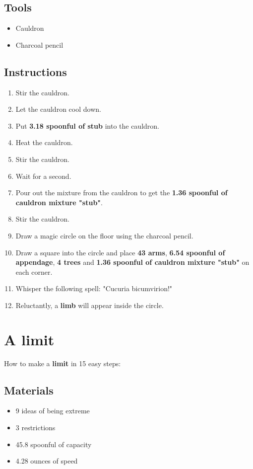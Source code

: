 \documentclass{article}
\begin{document}
\subsection{Tools}\begin{itemize}
\item 
Cauldron
\item 
Charcoal pencil
\end{itemize}
\subsection{Instructions}\begin{enumerate}
\item 
Stir the cauldron.
\item 
Let the cauldron cool down.
\item 
Put \textbf{3.18 spoonful of stub} into the cauldron.
\item 
Heat the cauldron.
\item 
Stir the cauldron.
\item 
Wait for a second.
\item 
Pour out the mixture from the cauldron to get the \textbf{1.36 spoonful of cauldron mixture "stub"}.
\item 
Stir the cauldron.
\item 
Draw a magic circle on the floor using the charcoal pencil.
\item 
Draw a square into the circle and place \textbf{43 arms}, \textbf{6.54 spoonful of appendage}, \textbf{4 trees} and \textbf{1.36 spoonful of cauldron mixture "stub"} on each corner.
\item 
Whisper the following spell: "Cucuria bicumvirion!"
\item 
Reluctantly, a \textbf{limb} will appear inside the circle.
\end{enumerate}
\newpage
\section{A limit}How to make a \textbf{limit} in 15 easy steps:

\subsection{Materials}\begin{itemize}
\item 
9 ideas of being extreme
\item 
3 restrictions
\item 
45.8 spoonful of capacity
\item 
4.28 ounces of speed
\end{itemize}
\end{document}

